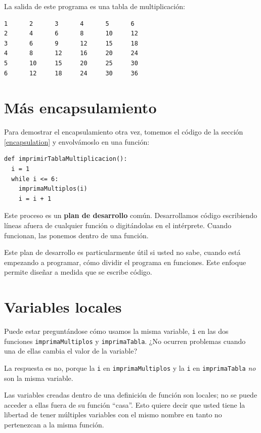 La salida de este programa es una tabla de multiplicación:
\begin{verbatim}
1      2      3      4      5      6
2      4      6      8      10     12
3      6      9      12     15     18
4      8      12     16     20     24
5      10     15     20     25     30
6      12     18     24     30     36
\end{verbatim}

\section{Más encapsulamiento}

Para demostrar el encapsulamiento otra vez, tomemos el código de la
sección \ref{encapsulation} y envolvámoslo en una función:
\begin{verbatim}
def imprimirTablaMultiplicacion():
  i = 1
  while i <= 6:
    imprimaMultiplos(i)
    i = i + 1
\end{verbatim}

Este proceso es un \textbf{plan de desarrollo} común. Desarrollamos
código escribiendo líneas afuera de cualquier función o digitándolas
en el intérprete. Cuando funcionan, las ponemos dentro de una función.

Este plan de desarrollo es particularmente útil si usted no sabe,
cuando está empezando a programar, cómo dividir el programa en funciones.
Este enfoque permite diseñar a medida que se escribe código.

\section{Variables locales}

 

Puede estar preguntándose cómo usamos la misma variable, \texttt{i}
en las dos funciones \texttt{imprimaMultiplos} y \texttt{imprimaTabla}.
¿No ocurren problemas cuando una de ellas cambia el valor de la variable?

La respuesta es no, porque la \texttt{i} en \texttt{imprimaMultiplos}
y la \texttt{i} en \texttt{imprimaTabla} {\em no} son la misma
variable.

Las variables creadas dentro de una definición de función son locales;
no se puede acceder a ellas fuera de su función ``casa''. Esto quiere
decir que usted tiene la libertad de tener múltiples variables con
el mismo nombre en tanto no pertenezcan a la misma función.

